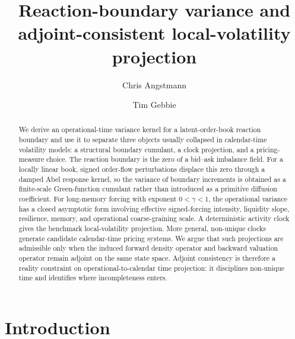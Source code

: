 \documentclass[11pt]{amsart}
\theoremstyle{definition}
\theoremstyle{plain}
\theoremstyle{remark}
\begin{document}
\title[Reaction-boundary variance]{Reaction-boundary variance and adjoint-consistent local-volatility projection}

\author{Chris Angstmann}
\address{School of Mathematics and Statistics, University of New South Wales, Sydney, NSW 2052, Australia}

\author{Tim Gebbie}
\address{Department of Statistical Sciences, University of Cape Town, Rondebosch 7701, Western Cape, South Africa}


\begin{abstract}
We derive an operational-time variance kernel for a latent-order-book reaction boundary and use it to separate three objects usually collapsed in calendar-time volatility models: a structural boundary cumulant, a clock projection, and a pricing-measure choice. The reaction boundary is the zero of a bid--ask imbalance field. For a locally linear book, signed order-flow perturbations displace this zero through a damped Abel response kernel, so the variance of boundary increments is obtained as a finite-scale Green-function cumulant rather than introduced as a primitive diffusion coefficient. For long-memory forcing with exponent $0<\gamma<1$, the operational variance has a closed asymptotic form involving effective signed-forcing intensity, liquidity slope, resilience, memory, and operational coarse-graining scale. A deterministic activity clock gives the benchmark local-volatility projection. More general, non-unique clocks generate candidate calendar-time pricing systems. We argue that such projections are admissible only when the induced forward density operator and backward valuation operator remain adjoint on the same state space. Adjoint consistency is therefore a reality constraint on operational-to-calendar time projection: it disciplines non-unique time and identifies where incompleteness enters.
\end{abstract}

\maketitle

\section{Introduction}
\end{document}
